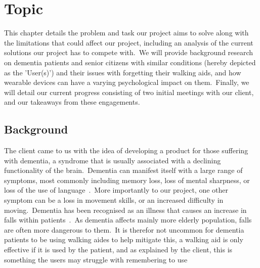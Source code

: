 \chapter{Topic} \label{ch:topic}

    This chapter details the problem and task our project aims to solve along with the limitations that could affect
    our project, including an analysis of the current solutions our project has to compete with.\ We will provide
    background research on dementia patients and senior citizens with similar conditions (hereby depicted as the
    'User(s)') and their issues with forgetting their walking aids, and how wearable devices can have a varying
    psychological impact on them.\ Finally, we will detail our current progress consisting of two initial meetings
    with our client, and our takeaways from these engagements.

    \section{Background}

        The client came to us with the idea of developing a product for those suffering with dementia, a syndrome that
        is usually associated with a declining functionality of the brain.\ Dementia can manifest itself with a large
        range of symptoms, most commonly including memory loss, loss of mental sharpness, or loss of the use of
        language~\cite{nhs_choices}.\ More importantly to our project, one other symptom can be a loss in movement
        skills, or an increased difficulty in moving.\ Dementia has been recognised as an illness that causes an
        increase in falls within
        patients~\cite{doorn_gruber-baldini_zimmerman_hebel_port_baumgarten_quinn_taler_may_magaziner_et_al._2003}.\ As
        dementia affects mainly more elderly population, falls are often more dangerous to them.\ It is therefor not
        uncommon for dementia patients to be using walking aides to help mitigate this, a walking aid is only effective
        if it is used by the patient, and as explained by the client, this is something the users may struggle with
        remembering to use

